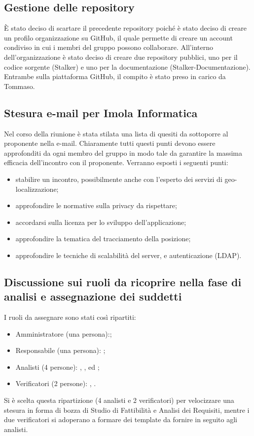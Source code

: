 \subsection{Gestione delle repository}
È stato deciso di scartare il precedente repository poiché è stato deciso di creare un profilo organizzazione su GitHub, il quale permette di creare un account condiviso in cui i membri del gruppo possono collaborare.
All'interno dell'organizzazione è stato deciso di creare due repository pubblici, uno per il codice sorgente (Stalker) e uno per la documentazione (Stalker-Documentazione).
Entrambe sulla piattaforma GitHub, il compito è stato preso in carico da Tommaso. 

\subsection{Stesura e-mail per Imola Informatica}
Nel corso della riunione è stata stilata una lista di quesiti da sottoporre al proponente nella e-mail. 
Chiaramente tutti questi punti devono essere approfonditi da ogni membro del gruppo in modo tale da garantire la massima efficacia dell'incontro con il proponente.
Verranno esposti i seguenti punti:
\begin{itemize}
\item stabilire un incontro, possibilmente anche con l'esperto dei servizi di geo-localizzazione;
\item approfondire le normative sulla privacy da rispettare;
\item accordarsi sulla licenza per lo sviluppo dell'applicazione;
\item approfondire la tematica del tracciamento della posizione;
\item approfondire le tecniche di scalabilità del server, e autenticazione (LDAP).
\end{itemize} 

\subsection{Discussione sui ruoli da ricoprire nella fase di analisi e assegnazione dei suddetti}
I ruoli da assegnare sono stati così ripartiti: 
\begin{itemize}
\item Amministratore (una persona):\AT;
\item Responsabile (una persona): \SE;
\item Analisti (4 persone): \LD, \BR, \PF ed \CE;
\item Verificatori (2 persone): \DF, \MC.
\end{itemize}
Si è scelta questa ripartizione (4 analisti e 2 verificatori) per velocizzare una stesura in forma di bozza di Studio di Fattibilità e Analisi dei Requisiti, mentre i due verificatori si adoperano a formare dei template da fornire in seguito agli analisti.

